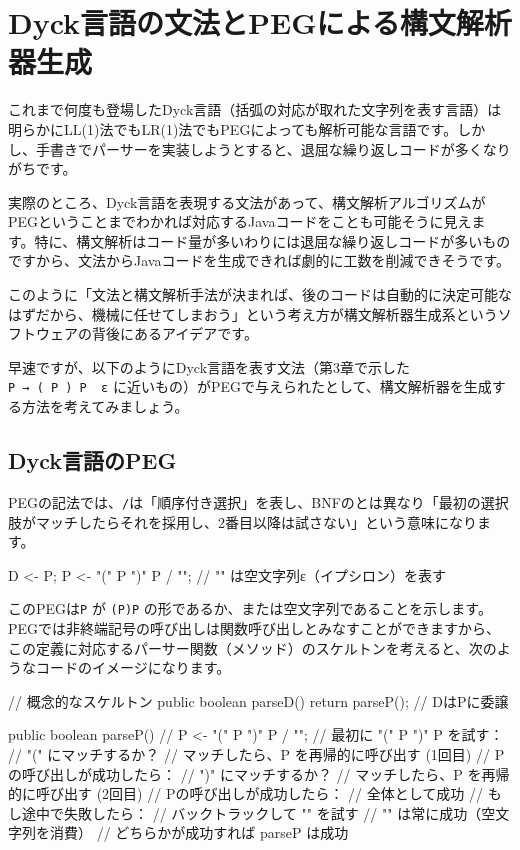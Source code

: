 \section{Dyck言語の文法とPEGによる構文解析器生成}

これまで何度も登場したDyck言語（括弧の対応が取れた文字列を表す言語）は明らかにLL(1)法でもLR(1)法でもPEGによっても解析可能な言語です。しかし、手書きでパーサーを実装しようとすると、退屈な繰り返しコードが多くなりがちです。

実際のところ、Dyck言語を表現する文法があって、構文解析アルゴリズムがPEGということまでわかれば対応するJavaコードをことも可能そうに見えます。特に、構文解析はコード量が多いわりには退屈な繰り返しコードが多いものですから、文法からJavaコードを生成できれば劇的に工数を削減できそうです。

このように「文法と構文解析手法が決まれば、後のコードは自動的に決定可能なはずだから、機械に任せてしまおう」という考え方が構文解析器生成系というソフトウェアの背後にあるアイデアです。

早速ですが、以下のようにDyck言語を表す文法（第3章で示した
\texttt{P\ →\ (\ P\ )\ P\ \textbar{}\ ε}
に近いもの）がPEGで与えられたとして、構文解析器を生成する方法を考えてみましょう。

\subsection{Dyck言語のPEG}

PEGの記法では、\texttt{/}は「順序付き選択」を表し、BNFの\texttt{\textbar{}}とは異なり「最初の選択肢がマッチしたらそれを採用し、2番目以降は試さない」という意味になります。

\begin{codescreen}{}
D <- P;
P <- "(" P ")" P / ""; // "" は空文字列ε（イプシロン）を表す
\end{codescreen}

このPEGは\texttt{P} が \texttt{(P)P}
の形であるか、または空文字列であることを示します。PEGでは非終端記号の呼び出しは関数呼び出しとみなすことができますから、この定義に対応するパーサー関数（メソッド）のスケルトンを考えると、次のようなコードのイメージになります。

\begin{codescreen}{}
// 概念的なスケルトン
public boolean parseD() {
    return parseP(); // DはPに委譲
}

public boolean parseP() {
    // P <- "(" P ")" P / "";
    // 最初に "(" P ")" P を試す：
    //   "(" にマッチするか？
    //   マッチしたら、P を再帰的に呼び出す (1回目)
    //   Pの呼び出しが成功したら： 
    //     ")" にマッチするか？
    //     マッチしたら、P を再帰的に呼び出す (2回目)
    //     Pの呼び出しが成功したら：
    //       全体として成功
    // もし途中で失敗したら：
    //   バックトラックして "" を試す
    //   "" は常に成功（空文字列を消費）
    // どちらかが成功すれば parseP は成功
}
\end{codescreen}

